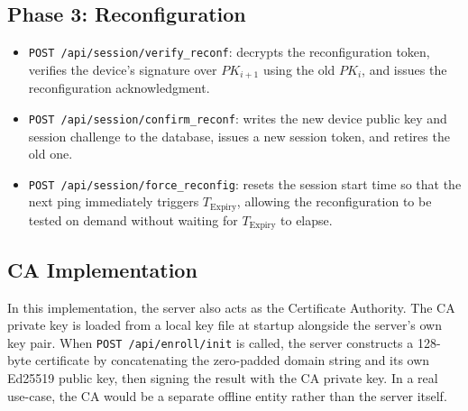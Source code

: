 \subsection{Phase 3: Reconfiguration}
\begin{itemize}
    \item \texttt{POST /api/session/verify\_reconf}: decrypts the reconfiguration token, verifies the device's signature over $PK_{i+1}$ using the old $PK_i$, and issues the reconfiguration acknowledgment.
    \item \texttt{POST /api/session/confirm\_reconf}: writes the new device public key and session challenge to the database, issues a new session token, and retires the old one. 
    \item \texttt{POST /api/session/force\_reconfig}:  resets the session start time so that the next ping immediately triggers $T_\text{Expiry}$, allowing the reconfiguration to be tested on demand without waiting for $T_\text{Expiry}$ to elapse.
\end{itemize} 

\subsection{CA Implementation}
In this implementation, the server also acts as the Certificate Authority. The CA private key is loaded from a local key file at startup alongside the server's own key pair. When \texttt{POST /api/enroll/init} is called, the server constructs a 128-byte certificate by concatenating the zero-padded domain string and its own Ed25519 public key, then signing the result with the CA private key. In a real use-case, the CA would be a separate offline entity rather than the server itself.





